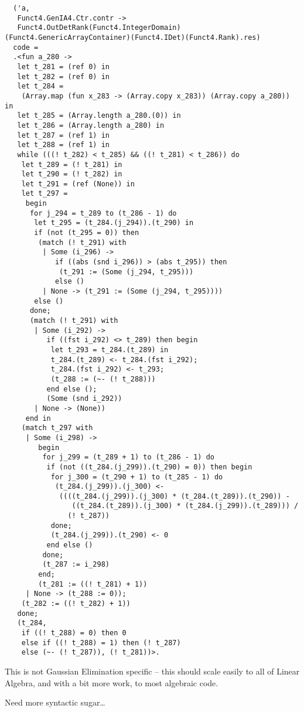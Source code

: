 \documentclass[landscape]{slides}
\begin{document}
\begin{slide}
\begin{small}
\begin{verbatim}
  ('a,
   Funct4.GenIA4.Ctr.contr ->
   Funct4.OutDetRank(Funct4.IntegerDomain)(Funct4.GenericArrayContainer)(Funct4.IDet)(Funct4.Rank).res)
  code =
  .<fun a_280 ->
   let t_281 = (ref 0) in
   let t_282 = (ref 0) in
   let t_284 =
    (Array.map (fun x_283 -> (Array.copy x_283)) (Array.copy a_280)) in
   let t_285 = (Array.length a_280.(0)) in
   let t_286 = (Array.length a_280) in
   let t_287 = (ref 1) in
   let t_288 = (ref 1) in
   while (((! t_282) < t_285) && ((! t_281) < t_286)) do
    let t_289 = (! t_281) in
    let t_290 = (! t_282) in
    let t_291 = (ref (None)) in
    let t_297 =
     begin
      for j_294 = t_289 to (t_286 - 1) do
       let t_295 = (t_284.(j_294)).(t_290) in
       if (not (t_295 = 0)) then
        (match (! t_291) with
         | Some (i_296) ->
            if ((abs (snd i_296)) > (abs t_295)) then
             (t_291 := (Some (j_294, t_295)))
            else ()
         | None -> (t_291 := (Some (j_294, t_295))))
       else ()
      done;
      (match (! t_291) with
       | Some (i_292) ->
          if ((fst i_292) <> t_289) then begin
           let t_293 = t_284.(t_289) in
           t_284.(t_289) <- t_284.(fst i_292);
           t_284.(fst i_292) <- t_293;
           (t_288 := (~- (! t_288)))
          end else ();
          (Some (snd i_292))
       | None -> (None))
     end in
    (match t_297 with
     | Some (i_298) ->
        begin
         for j_299 = (t_289 + 1) to (t_286 - 1) do
          if (not ((t_284.(j_299)).(t_290) = 0)) then begin
           for j_300 = (t_290 + 1) to (t_285 - 1) do
            (t_284.(j_299)).(j_300) <-
             ((((t_284.(j_299)).(j_300) * (t_284.(t_289)).(t_290)) -
                ((t_284.(t_289)).(j_300) * (t_284.(j_299)).(t_289))) /
               (! t_287))
           done;
           (t_284.(j_299)).(t_290) <- 0
          end else ()
         done;
         (t_287 := i_298)
        end;
        (t_281 := ((! t_281) + 1))
     | None -> (t_288 := 0));
    (t_282 := ((! t_282) + 1))
   done;
   (t_284,
    if ((! t_288) = 0) then 0
    else if ((! t_288) = 1) then (! t_287)
    else (~- (! t_287)), (! t_281))>.
\end{verbatim}
\end{small}
\end{slide}

\begin{slide}
    This is not Gaussian Elimination specific -- this should scale
    easily to all of Linear Algebra, and with a bit more work, to
    most algebraic code.

    Need more syntactic sugar\dots
\end{slide}
\end{document}
